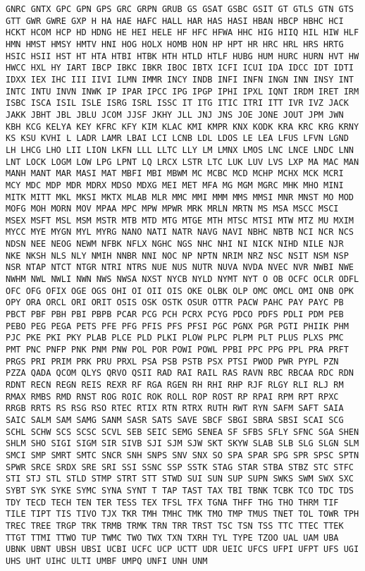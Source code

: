 \documentclass[11pt]{article}
\begin{document}
\begin{Verbatim}[commandchars=\\\{\}]
GNRC GNTX GPC GPN GPS GRC GRPN GRUB GS GSAT GSBC GSIT GT GTLS GTN GTS GTT GWR GWRE GXP H HA HAE HAFC HALL HAR HAS HASI HBAN HBCP HBHC HCI HCKT HCOM HCP HD HDNG HE HEI HELE HF HFC HFWA HHC HIG HIIQ HIL HIW HLF HMN HMST HMSY HMTV HNI HOG HOLX HOMB HON HP HPT HR HRC HRL HRS HRTG HSIC HSII HST HT HTA HTBI HTBK HTH HTLD HTLF HUBG HUM HURC HURN HVT HW HWCC HXL HY IART IBCP IBKC IBKR IBOC IBTX ICFI ICUI IDA IDCC IDT IDTI IDXX IEX IHC III IIVI ILMN IMMR INCY INDB INFI INFN INGN INN INSY INT INTC INTU INVN INWK IP IPAR IPCC IPG IPGP IPHI IPXL IQNT IRDM IRET IRM ISBC ISCA ISIL ISLE ISRG ISRL ISSC IT ITG ITIC ITRI ITT IVR IVZ JACK JAKK JBHT JBL JBLU JCOM JJSF JKHY JLL JNJ JNS JOE JONE JOUT JPM JWN KBH KCG KELYA KEY KFRC KFY KIM KLAC KMI KMPR KNX KODK KRA KRC KRG KRNY KS KSU KVHI L LADR LAMR LBAI LCI LCNB LDL LDOS LE LEA LFUS LFVN LGND LH LHCG LHO LII LION LKFN LLL LLTC LLY LM LMNX LMOS LNC LNCE LNDC LNN LNT LOCK LOGM LOW LPG LPNT LQ LRCX LSTR LTC LUK LUV LVS LXP MA MAC MAN MANH MANT MAR MASI MAT MBFI MBI MBWM MC MCBC MCD MCHP MCHX MCK MCRI MCY MDC MDP MDR MDRX MDSO MDXG MEI MET MFA MG MGM MGRC MHK MHO MINI MITK MITT MKL MKSI MKTX MLAB MLR MMC MMI MMM MMS MMSI MNR MNST MO MOD MOFG MOH MORN MOV MPAA MPC MPW MPWR MRK MRLN MRTN MS MSA MSCC MSCI MSEX MSFT MSL MSM MSTR MTB MTD MTG MTGE MTH MTSC MTSI MTW MTZ MU MXIM MYCC MYE MYGN MYL MYRG NANO NATI NATR NAVG NAVI NBHC NBTB NCI NCR NCS NDSN NEE NEOG NEWM NFBK NFLX NGHC NGS NHC NHI NI NICK NIHD NILE NJR NKE NKSH NLS NLY NMIH NNBR NNI NOC NP NPTN NRIM NRZ NSC NSIT NSM NSP NSR NTAP NTCT NTGR NTRI NTRS NUE NUS NUTR NUVA NVDA NVEC NVR NWBI NWE NWHM NWL NWLI NWN NWS NWSA NXST NYCB NYLD NYMT NYT O OB OCFC OCLR ODFL OFC OFG OFIX OGE OGS OHI OI OII OIS OKE OLBK OLP OMC OMCL OMI ONB OPK OPY ORA ORCL ORI ORIT OSIS OSK OSTK OSUR OTTR PACW PAHC PAY PAYC PB PBCT PBF PBH PBI PBPB PCAR PCG PCH PCRX PCYG PDCO PDFS PDLI PDM PEB PEBO PEG PEGA PETS PFE PFG PFIS PFS PFSI PGC PGNX PGR PGTI PHIIK PHM PJC PKE PKI PKY PLAB PLCE PLD PLKI PLOW PLPC PLPM PLT PLUS PLXS PMC PMT PNC PNFP PNK PNM PNW POL POR POWI POWL PPBI PPC PPG PPL PRA PRFT PRGS PRI PRIM PRK PRU PRXL PSA PSB PSTB PSX PTSI PWOD PWR PYPL PZN PZZA QADA QCOM QLYS QRVO QSII RAD RAI RAIL RAS RAVN RBC RBCAA RDC RDN RDNT RECN REGN REIS REXR RF RGA RGEN RH RHI RHP RJF RLGY RLI RLJ RM RMAX RMBS RMD RNST ROG ROIC ROK ROLL ROP ROST RP RPAI RPM RPT RPXC RRGB RRTS RS RSG RSO RTEC RTIX RTN RTRX RUTH RWT RYN SAFM SAFT SAIA SAIC SALM SAM SAMG SANM SASR SATS SAVE SBCF SBGI SBRA SBSI SCAI SCG SCHL SCHW SCS SCSC SCVL SEB SEIC SEMG SENEA SF SFBS SFLY SFNC SGA SHEN SHLM SHO SIGI SIGM SIR SIVB SJI SJM SJW SKT SKYW SLAB SLB SLG SLGN SLM SMCI SMP SMRT SMTC SNCR SNH SNPS SNV SNX SO SPA SPAR SPG SPR SPSC SPTN SPWR SRCE SRDX SRE SRI SSI SSNC SSP SSTK STAG STAR STBA STBZ STC STFC STI STJ STL STLD STMP STRT STT STWD SUI SUN SUP SUPN SWKS SWM SWX SXC SYBT SYK SYKE SYMC SYNA SYNT T TAP TAST TAX TBI TBNK TCBK TCO TDC TDS TDY TECD TECH TEN TER TESS TEX TFSL TFX TGNA THFF THG THO THRM TIF TILE TIPT TIS TIVO TJX TKR TMH TMHC TMK TMO TMP TMUS TNET TOL TOWR TPH TREC TREE TRGP TRK TRMB TRMK TRN TRR TRST TSC TSN TSS TTC TTEC TTEK TTGT TTMI TTWO TUP TWMC TWO TWX TXN TXRH TYL TYPE TZOO UAL UAM UBA UBNK UBNT UBSH UBSI UCBI UCFC UCP UCTT UDR UEIC UFCS UFPI UFPT UFS UGI UHS UHT UIHC ULTI UMBF UMPQ UNFI UNH UNM 
\end{Verbatim}
\end{document}
